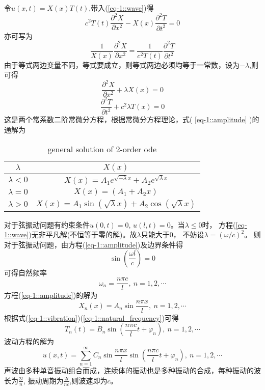 令$u\left(x,t\right)=X\left(x\right)T\left(t\right)$,带入(\ref{eq-1::wave})得
$$c^{2}T(t)\frac{\partial^{2}X}{\partial x^{2}}-X(x)\frac{\partial^{2}T}{\partial t^{2}}=0$$
亦可写为
$$\frac{1}{X(x)}\frac{\partial^{2}X}{\partial x^{2}}=\frac{1}{c^{2}T(t)}\frac{\partial^{2}T}{\partial t^{2}}$$
由于等式两边变量不同，等式要成立，则等式两边必须均等于一常数，设为$-\lambda$,则可得
\begin{equation}\label{eq-1::amplitude}
    \frac{\partial^{2}X}{\partial x^{2}}+\lambda X\left(x\right)=0
\end{equation}
\begin{equation}\label{eq-1::vibration}
    \frac{\partial^{2}T}{\partial t^{2}}+c^{2}\lambda T\left(x\right)=0
\end{equation}
这是两个常系数二阶常微分方程，根据常微分方程理论，式( \ref{eq-1::amplitude} )的通解为
\begin{table}[h!]
    \begin{center}
        \caption{general solution of 2-order ode}
        \begin{tabular}{cc}
            \toprule
            $\lambda$ & $X(x)$\\
            \midrule
            $\lambda<0$ & $X(x)=A_{1}e^{\sqrt{-\lambda}x}+A_{2}e^{\sqrt{\lambda}x}$\\
            $\lambda=0$ & $X(x)=(A_{1}+A_{2}x)$\\
            $\lambda>0$ & $X(x)=A_{1}\sin\left(\sqrt{\lambda}x\right)+A_{2}\cos\left(\sqrt{\lambda}x\right)$\\
            \bottomrule
        \end{tabular}
    \end{center}
\end{table}
对于弦振动问题有约束条件$u(0,t)=0$, $u(l,t)=0$。当$\lambda\le 0$时，
方程(\ref{eq-1::wave})无非平凡解(不恒等于零的解)。故$\lambda$只能大于0，
不妨设$\lambda=\left(\omega/c\right)^2$。
则对于弦振动问题，由方程(\ref{eq-1::amplitude})及边界条件得
\begin{equation}
    \sin\left(\frac{\omega l}{c}\right)=0
\end{equation}
可得自然频率
\begin{equation}\label{eq-1::natural_frequency}
    \omega_{n}=\frac{n\pi c}{l},\ n=1,2,\cdots
\end{equation}
方程(\ref{eq-1::amplitude})的解为
\begin{equation}
    X_{n}\left(x\right)=A_{n}\sin\frac{n\pi x}{l},\ n=1,2,\cdots
\end{equation}
根据式(\ref{eq-1::vibration})(\ref{eq-1::natural_frequency})可得
\begin{equation}
    T_{n}\left(t\right)=B_{n}\sin\left(\frac{n\pi c}{l}t+\varphi_{n}\right),\ n=1,2,\cdots
\end{equation}
波动方程的解为
\begin{equation}
    u\left(x,t\right)=\sum_{n=1}^{\infty} C_{n}\sin\frac{n\pi x}{l}\sin\left(\frac{n\pi c}{l}t+\varphi_{n}\right),\ n=1,2,\cdots
\end{equation}
声波由多种单音振动组合而成，连续体的振动也是多种振动的合成，每种振动的波长为$\frac{2l}{n}$,
振动周期为$\frac{2l}{nc}$,则波速即为$c$。


